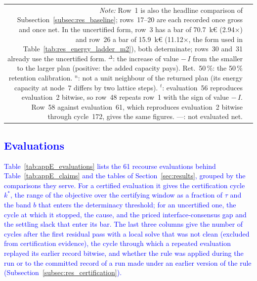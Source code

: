 \documentclass[preprint,12pt]{elsarticle}
\begin{document}
{\begin{longtable}{@{}r >{\raggedright\arraybackslash}p{0.265\textwidth} c r r r c r r c@{}}
\multicolumn{10}{@{}p{\linewidth}@{}}{\textit{Note:} Row~1 is also the headline comparison of Subsection~\ref{subsec:res_baseline}; rows~17--20 are each recorded once gross and once net. In the uncertified form, row~3 has a bar of 70.7~k\euro{} (2.94$\times$) and row~26 a bar of 15.9~k\euro{} (11.12$\times$, the form used in Table~\ref{tab:res_energy_ladder_m2}), both determinate; rows~30 and~31 already use the uncertified form. $^{\Delta}$: the increase of value $-\,I$ from the smaller to the larger plan (positive: the added capacity pays). Ret.\ 50\,\%: the 50\,\% retention calibration. $^{n}$: not a unit neighbour of the returned plan (its energy capacity at node~7 differs by two lattice steps). $^{t}$: evaluation~56 reproduces evaluation~2 bitwise, so row~48 repeats row~1 with the sign of value $-\,I$. Row~58 against evaluation~61, which reproduces evaluation~2 bitwise through cycle~172, gives the same figures. ---: not evaluated net.}\\
\end{longtable}}

\subsection{\textcolor{blue}{Evaluations}}
\label{app:results_evaluations}

\textcolor{blue}{
    Table~\ref{tab:appE_evaluations} lists the 61 recourse evaluations behind Table~\ref{tab:appE_claims} and the tables of Section~\ref{sec:results}, grouped by the comparisons they serve. For a certified evaluation it gives the certification cycle $k^{*}$, the range of the objective over the certifying window as a fraction of $\tau$ and the band $b$ that enters the determinacy threshold; for an uncertified one, the cycle at which it stopped, the cause, and the priced interface-consensus gap and the settling slack that enter its bar. The last three columns give the number of cycles after the first residual pass with a local solve that was not clean (excluded from certification evidence), the cycle through which a repeated evaluation replayed its earlier record bitwise, and whether the rule was applied during the run or to the committed record of a run made under an earlier version of the rule (Subsection~\ref{subsec:res_certification}).
}
\end{document}
